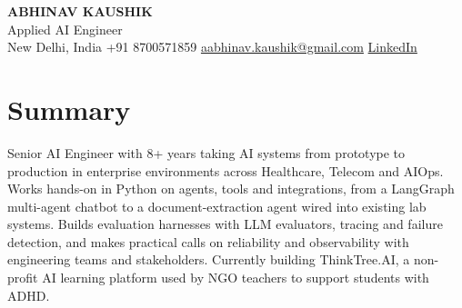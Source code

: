 \documentclass[10pt,a4paper]{article}
\begin{document}
\begin{center}
  {\LARGE\bfseries ABHINAV KAUSHIK}\\[2pt]
  {\large Applied AI Engineer}\\[2pt]
  New Delhi, India \textbar{} +91 8700571859 \textbar{} \href{mailto:aabhinav.kaushik@gmail.com}{aabhinav.kaushik@gmail.com} \textbar{} \href{https://www.linkedin.com/in/abhinav-kaushik10/}{LinkedIn}  
\end{center}

\section{Summary}
Senior AI Engineer with 8+ years taking AI systems from prototype to production in enterprise environments across Healthcare, Telecom and AIOps. Works hands-on in Python on agents, tools and integrations, from a LangGraph multi-agent chatbot to a document-extraction agent wired into existing lab systems. Builds evaluation harnesses with LLM evaluators, tracing and failure detection, and makes practical calls on reliability and observability with engineering teams and stakeholders. Currently building ThinkTree.AI, a non-profit AI learning platform used by NGO teachers to support students with ADHD.
\end{document}
